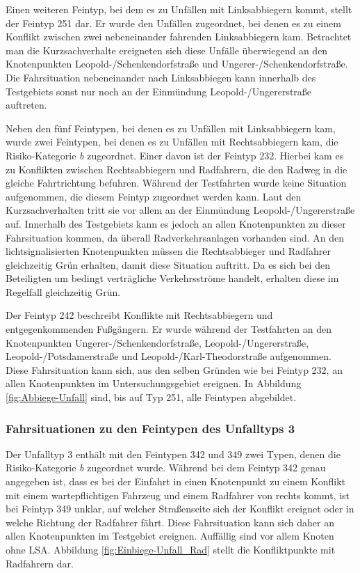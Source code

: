 Einen weiteren Feintyp, bei dem es zu Unfällen mit Linksabbiegern kommt, stellt der Feintyp 251 dar. Er wurde den Unfällen zugeordnet, bei denen es zu einem Konflikt zwischen zwei nebeneinander fahrenden Linksabbiegern kam. Betrachtet man die Kurzsachverhalte ereigneten sich diese Unfälle überwiegend an den Knotenpunkten Leopold-/Schenkendorfstraße und Ungerer-/Schenkendorfstraße. Die Fahrsituation nebeneinander nach Linksabbiegen kann innerhalb des Testgebiets sonst nur noch an der Einmündung Leopold-/Ungererstraße auftreten.

Neben den fünf Feintypen, bei denen es zu Unfällen mit Linksabbiegern kam, wurde zwei Feintypen, bei denen es zu Unfällen mit Rechtsabbiegern kam, die Risiko-Kategorie \textit{b} zugeordnet. Einer davon ist der Feintyp 232. Hierbei kam es zu Konflikten zwischen Rechtsabbiegern und Radfahrern, die den Radweg in die gleiche Fahrtrichtung befuhren. Während der Testfahrten wurde keine Situation aufgenommen, die diesem Feintyp zugeordnet werden kann. Laut den Kurzsachverhalten tritt sie vor allem an der Einmündung Leopold-/Ungererstraße auf. Innerhalb des Testgebiets kann es jedoch an allen Knotenpunkten zu dieser Fahrsituation kommen, da überall Radverkehrsanlagen vorhanden sind. An den lichtsignalisierten Knotenpunkten müssen die Rechtsabbieger und Radfahrer gleichzeitig Grün erhalten, damit diese Situation auftritt. Da es sich bei den Beteiligten um bedingt verträgliche Verkehrsströme handelt, erhalten diese im Regelfall gleichzeitig Grün.

Der Feintyp 242 beschreibt Konflikte mit Rechtsabbiegern und entgegenkommenden Fußgängern. Er wurde während der Testfahrten an den Knotenpunkten Ungerer-/Schenkendorfstraße, Leopold-/Ungererstraße, Leopold-/Potsdamerstraße und Leopold-/Karl-Theodorstraße aufgenommen. Diese Fahrsituation kann sich, aus den selben Gründen wie bei Feintyp 232, an allen Knotenpunkten im Untersuchungsgebiet ereignen. In Abbildung \ref{fig:Abbiege-Unfall} sind, bis auf Typ 251, alle Feintypen abgebildet.

\subsubsection{Fahrsituationen zu den Feintypen des Unfalltyps 3}
Der Unfalltyp 3 enthält mit den Feintypen 342 und 349 zwei Typen, denen die Risiko-Kategorie \textit{b} zugeordnet wurde. Während bei dem Feintyp 342 genau angegeben ist, dass es bei der Einfahrt in einen Knotenpunkt zu einem Konflikt mit einem wartepflichtigen Fahrzeug und einem Radfahrer von rechts kommt, ist bei Feintyp 349 unklar, auf welcher Straßenseite sich der Konflikt ereignet oder in welche Richtung der Radfahrer fährt. Diese Fahrsituation kann sich daher an allen Knotenpunkten im Testgebiet ereignen. Auffällig sind vor allem Knoten ohne \ac{LSA}. Abbildung \ref{fig:Einbiege-Unfall_Rad} stellt die Konfliktpunkte mit Radfahrern dar.


